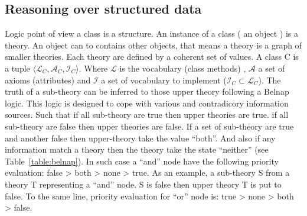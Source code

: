 \documentclass{llncs}
\begin{document}
\subsection{Reasoning over structured data}
Logic point of view a class is a structure. An instance of a class ( an object ) is a theory. An object can to contains other objects, that means a theory is a graph of smaller theories. Each theory are defined by a coherent set of values. A class C is a tuple \( \langle \mathcal{L}_{C}, \mathcal{A}_{C} , \mathcal{I}_{C} \rangle \). Where  \(\mathcal{L} \) is the vocabulary (class methods) ,  \(\mathcal{A} \)  a set of axioms (attributes) and \(\mathcal{I} \) a set of vocabulary to implement (\( \mathcal{I}_{C} \subset\mathcal{L}_{C} \)). The truth of a sub-theory can be inferred to those upper theory following a Belnap logic. This logic is designed to cope with various and contradicory information sources. Such that if all sub-theory are true then upper theories are true. if all sub-theory are false then upper theories are false. If a set of sub-theory are true and another false then upper-theory take the value ``both''. And also if any information match a theory then the theory take the state ``neither'' (see Table~\ref{table:belnap}). In such case a ``and'' node have the following priority evaluation: false > both > none > true. As an example, a sub-theory S from a theory  T representing a  ``and'' node. S is false then upper theory T is put to false. To the same line, priority evaluation for ``or'' node is: true > none > both > false.
    
\end{document}
